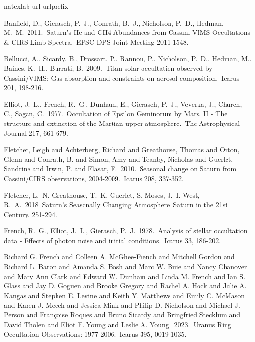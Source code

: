 \documentclass[12pt]{article}
\begin{document}
\begin{thebibliography}{28}
\expandafter\ifx\csname natexlab\endcsname\relax\def\natexlab#1{#1}\fi
\expandafter\ifx\csname url\endcsname\relax
 \def\url#1{\texttt{#1}}\fi
\expandafter\ifx\csname urlprefix\endcsname\relax\def\urlprefix{URL }\fi
\providecommand{\eprint}[2][]{\url{#2}}

 Banfield, D., Gierasch, P.~J.,
Conrath, B.~J., Nicholson, P.~D., Hedman, M.~M.\ 2011.\ Saturn's He and CH4
Abundances from Cassini VIMS Occultations \& CIRS Limb Spectra.\ EPSC-DPS
Joint Meeting 2011 1548.

 Bellucci, A., Sicardy, B., Drossart, P.,
Rannou, P., Nicholson, P.~D., Hedman, M., Baines, K.~H., Burrati, B.\ 2009.\
Titan solar occultation observed by Cassini/VIMS: Gas absorption and
constraints on aerosol composition.\ Icarus 201, 198-216.

 Elliot, J.~L., French, R.~G.,
Dunham, E., Gierasch, P.~J., Veverka, J., Church, C., Sagan, C.\ 1977.\ Occultation
of Epsilon Geminorum by Mars. II - The structure and extinction of the Martian
upper atmosphere.\ The Astrophysical Journal 217, 661-679.

 Fletcher, Leigh and Achterberg,
Richard and Greathouse, Thomas and Orton, Glenn and Conrath, B. and Simon, Amy
and Teanby, Nicholas and Guerlet, Sandrine and Irwin, P. and Flasar, F.\ 2010.\
Seasonal change on Saturn from Cassini/CIRS observations, 2004-2009.\ Icarus
208, 337-352.

 {Fletcher}, L.~N. {Greathouse},
T.~K. {Guerlet}, S. {Moses}, J.~I. {West}, R.~A.\ 2018\ Saturn's Seasonally
Changing Atmosphere\ Saturn in the 21st Century, 251-294.

 French, R.~G., Elliot, J.~L.,
Gierasch, P.~J.\ 1978.\ Analysis of stellar occultation data - Effects of
photon noise and initial conditions.\ Icarus 33, 186-202.

 Richard G. French and Colleen A.
McGhee-French and Mitchell Gordon and Richard L. Baron and Amanda S. Bosh and
Marc W. Buie and Nancy Chanover and Mary Ann Clark and Edward W. Dunham and
Linda M. French and Ian S. Glass and Jay D. Goguen and Brooke Gregory and
Rachel A. Hock and Julie A. Kangas and Stephen E. Levine and Keith Y. Matthews
and Emily C. McMason and Karen J. Meech and Jessica Mink and Philip D.
Nicholson and Michael J. Person and Françoise Roques and Bruno Sicardy and
Bringfried Stecklum and David Tholen and Eliot F. Young and Leslie A. Young.\
2023.\ Uranus Ring Occultation Observations: 1977-2006.\ Icarus 395, 0019-1035.


\end{thebibliography}
\end{document}
